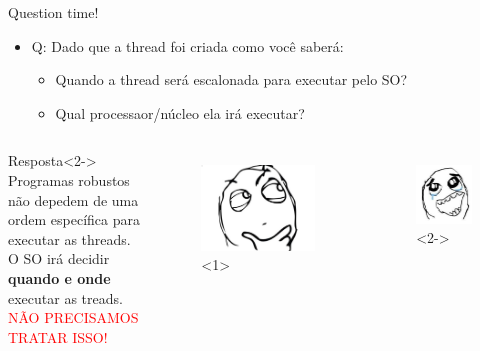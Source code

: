 \documentclass[10pt, xcolor=x11names]{beamer}
\begin{document}

\begin{frame}
	\begin{alertblock}{Question time!}

		\begin{itemize}
			\item Q: Dado que a thread foi criada como você saberá:
				\begin{itemize}
					\item Quando a thread será escalonada para executar pelo SO?
					\item Qual processaor/núcleo ela irá executar?	
				\end{itemize}
		\end{itemize}
	\end{alertblock}

	\begin{columns}	
			\begin{block}{Resposta}<2->
				Programas robustos não depedem de uma ordem específica para executar as threads. \\
				O SO irá decidir \textbf{quando e onde} executar as treads. \\
				\textcolor{red}{NÃO PRECISAMOS TRATAR ISSO!}				
			\end{block}

			\begin{figure}
				\includegraphics[width=.55\linewidth]{img/question-meme.jpg}<1>
			\end{figure}	
			\begin{figure}
				\includegraphics[width=.55\linewidth]{img/question-answer.jpg}<2->
			\end{figure}
 			
	\end{columns}
\end{frame}
\end{document}
